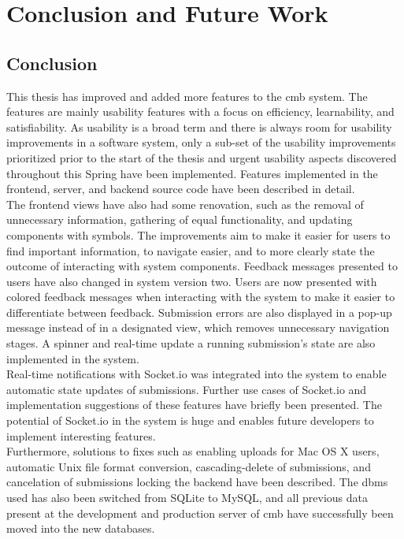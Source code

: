 \chapter{Conclusion and Future Work}
\label{ch:conclusion}

\section{Conclusion}
This thesis has improved and added more features to the \gls{cmb} system. The features are mainly usability features with a focus on efficiency, learnability, and satisfiability. As usability is a broad term and there is always room for usability improvements in a software system, only a sub-set of the usability improvements prioritized prior to the start of the thesis and urgent usability aspects discovered throughout this Spring have been implemented. Features implemented in the frontend, server, and backend source code have been described in detail. \\

The frontend views have also had some renovation, such as the removal of unnecessary information, gathering of equal functionality, and updating components with symbols. The improvements aim to make it easier for users to find important information, to navigate easier, and to more clearly state the outcome of interacting with system components. Feedback messages presented to users have also changed in system version two. Users are now presented with colored feedback messages when interacting with the system to make it easier to differentiate between feedback. Submission errors are also displayed in a pop-up message instead of in a designated view, which removes unnecessary navigation stages. A spinner and real-time update a running submission's state are also implemented in the system. \\

Real-time notifications with Socket.io was integrated into the system to enable automatic state updates of submissions. Further use cases of Socket.io and implementation suggestions of these features have briefly been presented. The potential of Socket.io in the system is huge and enables future developers to implement interesting features. \\

Furthermore, solutions to fixes such as enabling uploads for Mac OS X users, automatic Unix file format conversion, cascading-delete of submissions, and cancelation of submissions locking the backend have been described. The \gls{dbms} used has also been switched from SQLite to MySQL, and all previous data present at the development and production server of \gls{cmb} have successfully been moved into the new databases. \\

